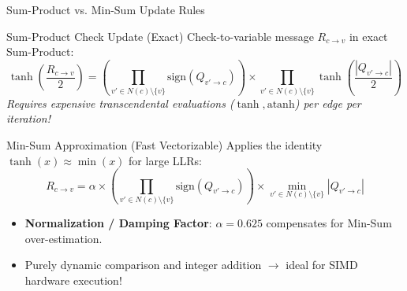 \begin{frame}{Sum-Product vs. Min-Sum Update Rules}
    \begin{block}{Sum-Product Check Update (Exact)}
        Check-to-variable message $R_{c \rightarrow v}$ in exact Sum-Product:
        $$\tanh\left(\frac{R_{c \rightarrow v}}{2}\right) = \left( \prod_{v' \in N(c) \setminus \{v\}} \text{sign}(Q_{v' \rightarrow c}) \right) \times \prod_{v' \in N(c) \setminus \{v\}} \tanh\left(\frac{|Q_{v' \rightarrow c}|}{2}\right)$$
        \textit{Requires expensive transcendental evaluations ($\tanh, \text{atanh}$) per edge per iteration!}
    \end{block}
    
    \begin{block}{Min-Sum Approximation (Fast Vectorizable)}
        Applies the identity $\tanh(x) \approx \min(x)$ for large LLRs:
        $$R_{c \rightarrow v} = \alpha \times \left( \prod_{v' \in N(c) \setminus \{v\}} \text{sign}(Q_{v' \rightarrow c}) \right) \times \min_{v' \in N(c) \setminus \{v\}} |Q_{v' \rightarrow c}|$$
        \begin{itemize}
            \item \textbf{Normalization / Damping Factor}: $\alpha = 0.625$ compensates for Min-Sum over-estimation.
            \item Purely dynamic comparison and integer addition $\rightarrow$ ideal for SIMD hardware execution!
        \end{itemize}
    \end{block}
\end{frame}

